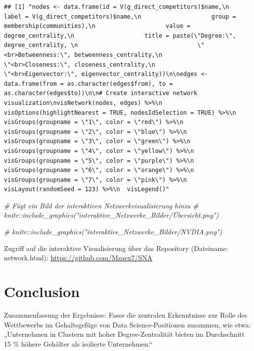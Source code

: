 \documentclass[
]{article}
\newenvironment{Shaded}{\begin{snugshade}}{\end{snugshade}}
\newcommand{\CommentTok}[1]{\textcolor[rgb]{0.56,0.35,0.01}{\textit{#1}}}
\begin{document}
\begin{verbatim}
## [1] "nodes <- data.frame(id = V(g_direct_competitors)$name,\n                    label = V(g_direct_competitors)$name,\n                    group = membership(communities),\n                    value = degree_centrality,\n                    title = paste(\"Degree:\", degree_centrality, \n                                  \"<br>Betweenness:\", betweenness_centrality,\n                                  \"<br>Closeness:\", closeness_centrality,\n                                  \"<br>Eigenvector:\", eigenvector_centrality))\n\nedges <- data.frame(from = as.character(edges$from), to = as.character(edges$to))\n\n# Create interactive network visualization\nvisNetwork(nodes, edges) %>%\n  visOptions(highlightNearest = TRUE, nodesIdSelection = TRUE) %>%\n  visGroups(groupname = \"1\", color = \"red\") %>%\n  visGroups(groupname = \"2\", color = \"blue\") %>%\n  visGroups(groupname = \"3\", color = \"green\") %>%\n  visGroups(groupname = \"4\", color = \"yellow\") %>%\n  visGroups(groupname = \"5\", color = \"purple\") %>%\n  visGroups(groupname = \"6\", color = \"orange\") %>%\n  visGroups(groupname = \"7\", color = \"pink\") %>%\n  visLayout(randomSeed = 123) %>%\n  visLegend()"
\end{verbatim}

\begin{Shaded}
\begin{Highlighting}[]
\CommentTok{\# Fügt ein Bild der interaktiven Netzwerkvisualisierung hinzu}
\CommentTok{\# knitr::include\_graphics("interaktive\_Netzwerke\_Bilder/Übersicht.png")}

\CommentTok{\# knitr::include\_graphics("interaktive\_Netzwerke\_Bilder/NVDIA.png")}
\end{Highlighting}
\end{Shaded}

Zugriff auf die interaktive Visualisierung über das Repository
(Dateiname: network.html): \url{https://github.com/Mzaex7/SNA}

\newpage

\section{Conclusion}\label{conclusion}

Zusammenfassung der Ergebnisse: Fasse die zentralen Erkenntnisse zur
Rolle des Wettbewerbs im Gehaltsgefüge von Data Science-Positionen
zusammen, wie etwa: „Unternehmen in Clustern mit hoher
Degree-Zentralität bieten im Durchschnitt 15 \% höhere Gehälter als
isolierte Unternehmen.``
\end{document}
